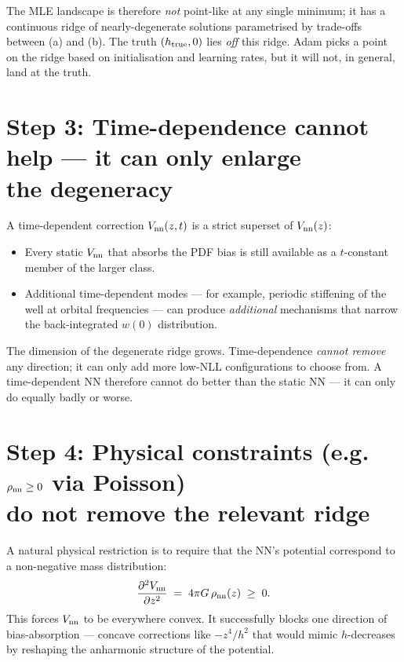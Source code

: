 \documentclass[11pt]{article}
\begin{document}
The MLE landscape is therefore \emph{not} point-like at any single minimum; it
has a continuous ridge of nearly-degenerate solutions parametrised by
trade-offs between (a) and (b).  The truth $(h_{\rm true}, 0)$ lies \emph{off}
this ridge.  Adam picks a point on the ridge based on initialisation and
learning rates, but it will not, in general, land at the truth.

\section*{Step 3: Time-dependence cannot help --- it can only enlarge\\
the degeneracy}

A time-dependent correction $V_{\rm nn}(z, t)$ is a strict superset of
$V_{\rm nn}(z)$:
\begin{itemize}[leftmargin=2em]
  \item Every static $V_{\rm nn}$ that absorbs the PDF bias is still available
        as a $t$-constant member of the larger class.
  \item Additional time-dependent modes --- for example, periodic stiffening of
        the well at orbital frequencies --- can produce \emph{additional}
        mechanisms that narrow the back-integrated $w(0)$ distribution.
\end{itemize}

The dimension of the degenerate ridge grows.  Time-dependence \emph{cannot
remove} any direction; it can only add more low-NLL configurations to choose
from.  A time-dependent NN therefore cannot do better than the static NN --- it
can only do equally badly or worse.

\section*{Step 4: Physical constraints (e.g.\ $\rho_{\rm nn} \ge 0$ via Poisson)\\
do not remove the relevant ridge}

A natural physical restriction is to require that the NN's potential
correspond to a non-negative mass distribution:
\begin{equation}
  \frac{\partial^2 V_{\rm nn}}{\partial z^2} \;=\; 4\pi G\,\rho_{\rm nn}(z) \;\ge\; 0.
\end{equation}
This forces $V_{\rm nn}$ to be everywhere convex.  It successfully blocks one
direction of bias-absorption --- concave corrections like $-z^4/h^2$ that would
mimic $h$-decreases by reshaping the anharmonic structure of the potential.
\end{document}
